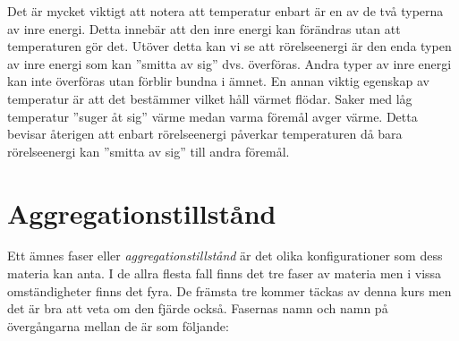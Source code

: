 Det är mycket viktigt att notera att temperatur enbart är en av de två typerna av inre energi. Detta innebär att den inre energi kan förändras utan att temperaturen gör det. Utöver detta kan vi se att rörelseenergi är den enda typen av inre energi som kan ''smitta av sig'' dvs. överföras. Andra typer av inre energi kan inte överföras utan förblir bundna i ämnet. En annan viktig egenskap av temperatur är att det bestämmer vilket håll värmet flödar. Saker med låg temperatur ''suger åt sig'' värme medan varma föremål avger värme. Detta bevisar återigen att enbart rörelseenergi påverkar temperaturen då bara rörelseenergi kan ''smitta av sig'' till andra föremål.

\section{Aggregationstillstånd}
Ett ämnes faser eller \emph{aggregationstillstånd} är det olika konfigurationer som dess materia kan anta. I de allra flesta fall finns det tre faser av materia men i vissa omständigheter finns det fyra. De främsta tre kommer täckas av denna kurs men det är bra att veta om den fjärde också. Fasernas namn och namn på övergångarna mellan de är som följande:
